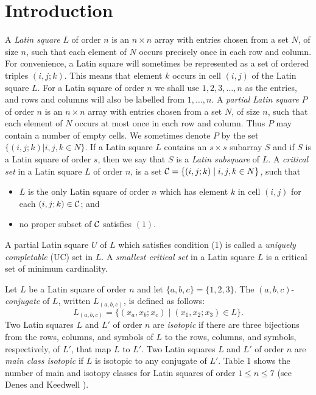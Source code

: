 \section{Introduction}   
\setcounter{theorem}{0}
A {\it Latin square} $L$ of order $n$ is an 
$n\times n$ array with entries 
chosen from a set $N$, of size $n$, such that each element of $N$ occurs 
precisely once in each row and column. 
For convenience, a Latin square will sometimes be represented as a 
set of ordered triples $(i,j;k)$.  This means that element 
$k$ occurs in cell $(i,j)$ of the Latin square $L$.
For a Latin square of order $n$ we shall use $1,2,3,\dots,n$ 
as the entries, and rows and columns will also be labelled from 
$1,\dots,n$.
A {\it partial Latin square} $P$ of order $n$ is an $n\times n$ 
array with entries chosen from a set $N$, of size $n$, such that each
element of $N$ occurs at most once in each row and column. Thus $P$ may
contain a number of empty cells. We sometimes denote $P$ by 
the set $\{(i,j;k)|i,j,k\in N\}$.
If a Latin square $L$ contains an $s\times s$ 
subarray $S$ and if $S$ is a Latin square of order $s$, then we say 
that $S$ is a {\it Latin subsquare} of $L$. 
A {\it critical set} in a Latin square $L$ of order $n$, is a 
set ${\cal C}=\{(i,j;k)\;|\; i,j,k\in N\}$, such that
\begin{itemize}
\item[(1)] $L$ is the only Latin square of order $n$ which has 
element $k$ in cell $(i,j)$ for each $(i,j;k)\in {\cal C}$; and

\item[(2)] no proper subset of ${\cal C}$ satisfies $(1)$.
\end{itemize}

A partial Latin square $U$ of $L$ which satisfies condition (1) is called
a {\em uniquely completable} (UC) set in $L$.  A {\it smallest critical set} 
in a Latin square $L$ is a critical set of minimum cardinality.

Let $L$ be a Latin square of order $n$ and let
$\{a,b,c\}=\{1,2,3\}$. The $(a,b,c)$-{\it conjugate} of $L$, written
$L_{(a,b,c)}$, is defined as follows:
\[ L_{(a,b,c)}=\{(x_a,x_b;x_c)\mid (x_1,x_2;x_3)\in L\}. \]
Two Latin squares $L$ and $L'$ of order $n$ are 
{\it isotopic} if there are three bijections from the rows, columns, and
symbols of $L$ to the rows, columns, and symbols, respectively, of 
$L'$, that map $L$ to $L'$. Two Latin squares $L$ and $L'$ of 
order $n$ are {\it main class isotopic} if $L$ is isotopic to any 
conjugate of $L'$. Table 1 shows the number of main and isotopy
classes for Latin squares of order $1\leq n\leq 7$ (see Denes and
Keedwell \cite {dk}). 

